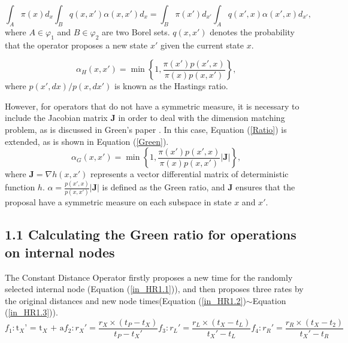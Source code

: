 \documentclass{bmcart}
\begin{document}
\begin{backmatter}
\begin{equation}\label{balance}
\int_A {\pi (x) d_x} {\int_B  {q(x, x')}{\alpha(x, x')} d_x}  = \int_B {\pi (x') d_{x'}}{\int_A {q(x', x)}{\alpha(x', x)} d_{x'}} \text{,}
\end{equation}
where $A \in {\varphi_1}$ and $B \in  {\varphi_2}$ are two Borel sets. ${q(x, x')}$ denotes the probability that the operator proposes a new state $x'$ given the current state $x$.

\begin{equation}\label{Ratio}
{\alpha_H}(x, x') = \min \left\{ {1,\frac{{\pi (x'){p}(x',x)}}{{\pi (x){p}(x,x')}}} \right\} \text{,}
\end{equation}
where ${p(x',dx)}/{p(x,dx')}$ is known as the Hastings ratio.

However, for operators that do not have a symmetric measure, it is necessary to include the Jacobian matrix ${\mathbf{J}}$  in order to deal with the dimension matching problem, as is discussed in Green's paper \cite{green1995reversible}. In this case, Equation (\ref{Ratio}) is extended, as is shown in Equation (\ref{Green}).
\begin{equation}\label{Green}
{\alpha_G}(x, x') = \min \left\{ {1,\frac{{\pi (x'){p}(x',x)}}{{\pi (x){p}(x,x')}}}\left|{\mathbf{J}}\right| \right\} \text{,}
\end{equation}
where ${\mathbf{J}} = {\nabla h(x, x')}$ represents a vector differential matrix of deterministic function $h$. $\alpha = \frac{{p}(x',x)}{{p}(x,x')}\left|{\mathbf{J}}\right|$ is defined as the Green ratio, and ${\mathbf{J}}$ ensures that the proposal have a symmetric measure on each subspace in state $x$ and $x'$.

\subsection*{1.1 Calculating the Green ratio for operations on internal nodes}

The Constant Distance Operator firstly proposes a new time for the randomly selected internal node (Equation (\ref{in_HR1.1})), and then proposes three rates by the original distances and new node times(Equation (\ref{in_HR1.2})$\sim$Equation (\ref{in_HR1.3})).
\begin{subequations}\label{in_HR1}
\begin{equation}\label{in_HR1.1}
{f_1}:{{\text{t}}_X}{\text{'  =  }}{{\text{t}}_X}{\text{  +  a}}
\end{equation}
\begin{equation}\label{in_HR1.2}
{f_2}:{r_X}' = \frac{{{r_X} \times ({t_P} - {t_X})}}{{{t_P} - {t_X}'}}
\end{equation}
\begin{equation}
{f_3}:{r_L}' = \frac{{{r_L} \times ({t_X} - {t_L})}}{{{t_X}' - {t_L}}}
\end{equation}
\begin{equation}\label{in_HR1.3}
{f_4}:{r_R}' = \frac{{{r_R} \times ({t_X} - {t_2})}}{{{t_X}' - {t_R}}}
\end{equation}
\end{subequations}


\end{backmatter}
\end{document}
